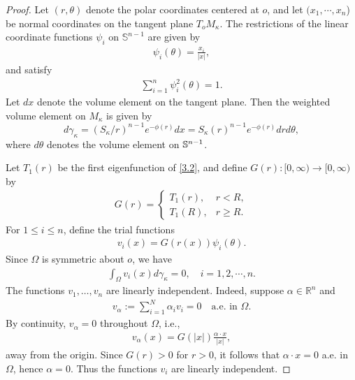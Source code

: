 \documentclass[11pt,leqno]{amsart}
\def\k{\kappa}
\def\S{\Bbb S}
\def\R{\mathbb{R}}
\def\k{\kappa}
\numberwithin{equation}{section}
\begin{document}
\begin{proof}
Let $(r, \theta)$ denote the polar coordinates centered at $o$, and let $(x_1, \cdots, x_n$)  be  normal coordinates on the tangent plane $T_o M_\k$.
The restrictions of the linear coordinate functions $\psi_i$ on $\mathbb{S}^{n-1}$ are given by
\begin{align*}
\psi_i(\theta)=\frac{x_i}{|x|},
\end{align*}
and satisfy
\begin{align}\label{4.1}
    \sum_{i=1}^n \psi_i^2(\theta)=1.
\end{align}
Let  $dx$ denote the volume element on  the tangent plane. Then the  weighted volume element on 
$M_\k$ is given by 
$$d\gamma_{\k}=(S_{\k}/r)^{n-1}e^{-\phi(r)}dx=S_{\k}(r)^{n-1}e^{-\phi(r)}drd\theta,$$
where $d\theta$  denotes the volume element on $\S^{n-1}$.

Let $T_{1}(r)$ be the first eigenfunction of  \eqref{3.2}, and 
define $G(r) : [0,\infty) \to [0,\infty)$ by
\begin{align*}
G(r) =
\begin{cases}
T_{1}(r), & r < R, \\
T_{1}(R), & r \geq R.
\end{cases}
\end{align*}
For $1\le i\le n$, define the trial functions
\begin{align*}
    v_i(x) = G(r(x))\psi_i(\theta).
\end{align*}
Since $\Omega$ is symmetric about $o$, we have 
\begin{align*}
    \int_{\Omega}v_{i}(x)d\gamma_{\k}=0, \quad i=1,2,\cdots, n.
\end{align*}
The functions $v_1,\ldots,v_n$ are linearly independent. Indeed, suppose $\alpha\in\R^n$ and
\begin{align*}
v_\alpha:=\sum_{i=1}^{N}\alpha_i v_i=0
\quad\text{a.e. in }\Omega.
\end{align*}
By continuity, $v_\alpha=0$ throughout $\Omega$, i.e.,
\begin{align*}
v_\alpha(x)=G(|x|)\frac{\alpha\cdot x}{|x|},
\end{align*}
away from the origin. 
Since $G(r)>0$ for $r>0$, it follows that  $\alpha\cdot x=0$ a.e. in $\Omega$,  hence $\alpha=0$. Thus the functions $v_i$ are linearly independent.


\end{proof}
\end{document}
